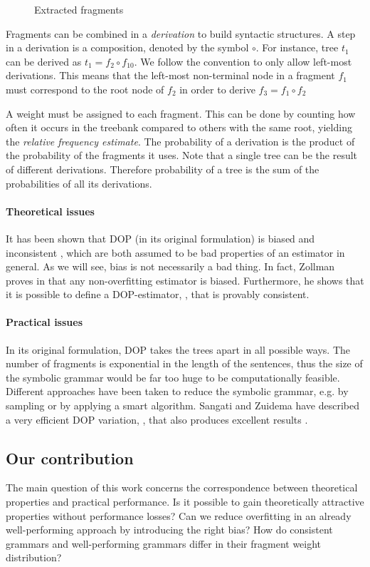 \begin{figure}[h!]
\center 
\caption{Extracted fragments}
\label{f:fragments}
\end{figure}


Fragments can be combined in a \emph{derivation} to build syntactic structures. A step in a derivation is a composition, denoted by the symbol $\circ$. For instance, tree $t_1$ can be derived as $t_1=f_2\circ f_{10}$. We follow the convention to only allow left-most derivations. This means that the left-most non-terminal node in a fragment $f_1$ must correspond to the root node of $f_2$ in order to derive $f_3=f_1\circ f_2$

A weight must be assigned to each fragment. This can be done by counting how often it occurs in the treebank compared to others with the same root, yielding the \emph{relative frequency estimate}. The probability of a derivation is the product of the probability of the fragments it uses. Note that a single tree can be the result of different derivations. Therefore probability of a tree is the sum of the probabilities of all its derivations.

\paragraph{Theoretical issues}
It has been shown that DOP (in its original formulation) is biased and inconsistent \cite{johnson2002}, which are both assumed to be bad properties of an estimator in general. As we will see, bias is not necessarily a bad thing. In fact, Zollman proves in  \cite{zollmann2005} that any non-overfitting estimator is biased. Furthermore, he shows that it is possible to define a DOP-estimator, \dops{}, that is provably consistent.


\paragraph{Practical issues}
In its original formulation, DOP takes the trees apart in all possible ways. The number of fragments is exponential in the length of the sentences, thus the size of the symbolic grammar would be far too huge to be computationally feasible. 
Different approaches have been taken to reduce the symbolic grammar, e.g. by sampling or by applying a smart algorithm. Sangati and Zuidema have described a very efficient DOP variation, \ddop{}, that also produces excellent results \cite{sangati2011}.


\subsection{Our contribution}
The main question of this work concerns the correspondence between theoretical properties and practical performance. Is it possible to gain theoretically attractive properties without performance losses? Can we reduce overfitting in an already well-performing approach by introducing the right bias? How do consistent grammars and well-performing grammars differ in their fragment weight distribution?

